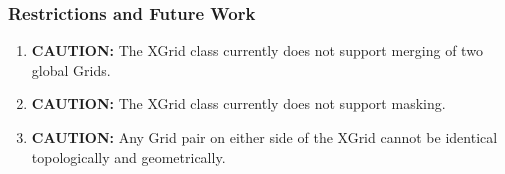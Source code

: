 
\subsubsection{Restrictions and Future Work}

\begin{enumerate}
\label{XGrid:rest}

\item {\bf CAUTION:} The XGrid class currently does not support merging of two global Grids. 
\item {\bf CAUTION:} The XGrid class currently does not support masking.
\item {\bf CAUTION:} Any Grid pair on either side of the XGrid cannot be identical topologically and geometrically.

\end{enumerate}



